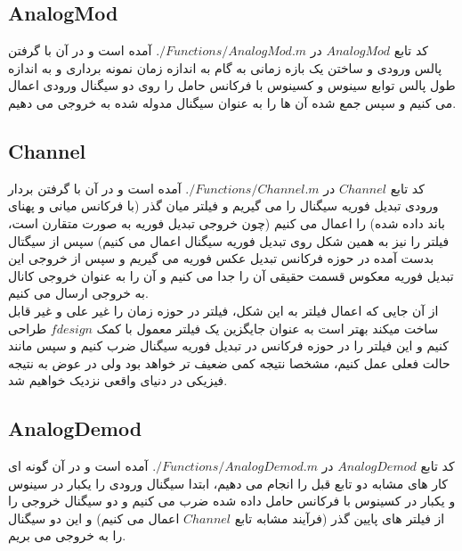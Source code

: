 \documentclass[a4paper,12pt]{article}
\begin{document}
\subsection{AnalogMod}
کد تابع $AnalogMod$ در $./Functions/AnalogMod.m$ آمده است و در آن با گرفتن پالس ورودی و ساختن یک بازه زمانی به گام به اندازه زمان نمونه برداری و به اندازه طول پالس توابع سینوس و کسینوس با فرکانس حامل را روی دو سیگنال ورودی اعمال می کنیم و سپس جمع شده آن ها را به عنوان  سیگنال مدوله شده به خروجی می دهیم.
\\
\subsection{Channel}
کد تابع $Channel$ در $./Functions/Channel.m$ آمده است و در آن با گرفتن بردار ورودی تبدیل فوریه سیگنال را می گیریم و فیلتر میان گذر (با فرکانس میانی و پهنای باند داده شده) را اعمال می کنیم (چون خروجی تبدیل فوریه به صورت متقارن است، فیلتر را نیز به همین شکل روی تبدیل فوریه سیگنال اعمال می کنیم) سپس از سیگتال بدست آمده در حوزه فرکانس تبدیل عکس فوریه می گیریم و سپس از خروجی این تبدیل فوریه معکوس قسمت حقیقی آن را جدا می کنیم و آن را به عنوان خروجی کانال به خروجی ارسال می کنیم.
\\
از آن جایی که اعمال فیلتر به این شکل، فیلتر در حوزه زمان را غیر علی و غیر قابل ساخت میکند بهتر است به عنوان جایگزین یک فیلتر معمول با کمک $fdesign$ طراحی کنیم و این فیلتر را در حوزه فرکانس در تبدیل فوریه سیگنال ضرب کنیم و سپس مانند حالت فعلی عمل کنیم، مشخصا نتیجه کمی ضعیف تر خواهد بود ولی در عوض به نتیجه فیزیکی در دنیای واقعی نزدیک خواهیم شد.
\\
\subsection{AnalogDemod}
کد تابع $AnalogDemod$ در $./Functions/AnalogDemod.m$ آمده است و در آن گونه ای کار های مشابه دو تابع قبل را انجام می دهیم، ابتدا سیگنال ورودی را یکبار در سینوس و یکبار در کسینوس با فرکانس حامل داده شده ضرب می کنیم و دو سیگنال خروجی را از فیلتر های پایین گذر (فرآیند مشابه تابع $Channel$ اعمال می کنیم) و این دو سیگنال را به خروجی می بریم.
\\
\end{document}
